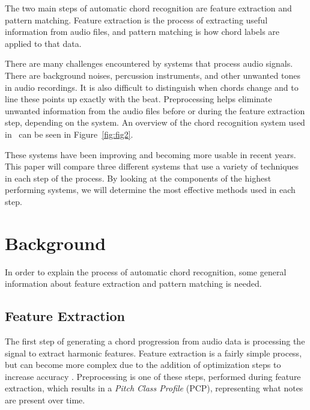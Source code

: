 \documentclass{sig-alternate}
\begin{document}
The two main steps of automatic chord recognition are feature extraction and pattern matching. Feature extraction is the process of extracting useful information from audio files, and pattern matching is how chord labels are applied to that data. 

There are many challenges encountered by systems that process audio signals. There are background noises, percussion instruments, and other unwanted tones in audio recordings. It is also difficult to distinguish when chords change and to line these points up exactly with the beat. Preprocessing helps eliminate unwanted information from the audio files before or during the feature extraction step, depending on the system. An overview of the chord recognition system used in~\cite{Morman:2006} can be seen in Figure~\ref{fig:fig2}.

These systems have been improving and becoming more usable in recent years. This paper will compare three different systems that use a variety of techniques in each step of the process. By looking at the components of the highest performing systems, we will determine the most effective methods used in each step. 

\begin{figure*}
\centering
{}
\caption{Overview of the chord recognition system used in research case 1~\cite{Morman:2006}.}
\label{fig:fig2}
\end{figure*}  

\section{Background}
In order to explain the process of automatic chord recognition, some general information about feature extraction and pattern matching is needed.

\subsection{Feature Extraction}

The first step of generating a chord progression from audio data is processing the signal to extract harmonic features. Feature extraction is a fairly simple process, but can become more complex due to the addition of optimization steps to increase accuracy \cite{McVicar:2014}. Preprocessing is one of these steps, performed during feature extraction, which results in a \textit{Pitch Class Profile} (PCP), representing what notes are present over time.
\end{document}

